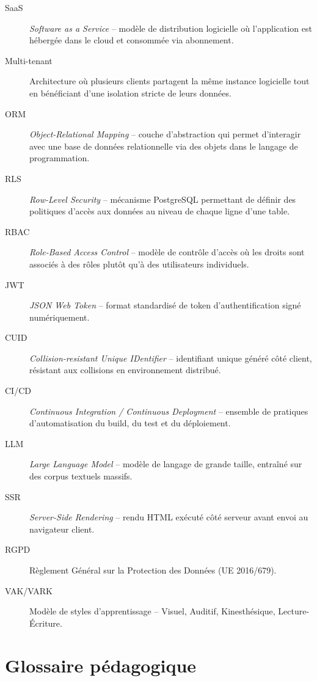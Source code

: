 \documentclass[12pt,a4paper,oneside]{report}
\begin{document}
\begin{description}
  \item[SaaS] \textit{Software as a Service} -- modèle de distribution logicielle où l'application est hébergée dans le cloud et consommée via abonnement.
  \item[Multi-tenant] Architecture où plusieurs clients partagent la même instance logicielle tout en bénéficiant d'une isolation stricte de leurs données.
  \item[ORM] \textit{Object-Relational Mapping} -- couche d'abstraction qui permet d'interagir avec une base de données relationnelle via des objets dans le langage de programmation.
  \item[RLS] \textit{Row-Level Security} -- mécanisme PostgreSQL permettant de définir des politiques d'accès aux données au niveau de chaque ligne d'une table.
  \item[RBAC] \textit{Role-Based Access Control} -- modèle de contrôle d'accès où les droits sont associés à des rôles plutôt qu'à des utilisateurs individuels.
  \item[JWT] \textit{JSON Web Token} -- format standardisé de token d'authentification signé numériquement.
  \item[CUID] \textit{Collision-resistant Unique IDentifier} -- identifiant unique généré côté client, résistant aux collisions en environnement distribué.
  \item[CI/CD] \textit{Continuous Integration / Continuous Deployment} -- ensemble de pratiques d'automatisation du build, du test et du déploiement.
  \item[LLM] \textit{Large Language Model} -- modèle de langage de grande taille, entraîné sur des corpus textuels massifs.
  \item[SSR] \textit{Server-Side Rendering} -- rendu HTML exécuté côté serveur avant envoi au navigateur client.
  \item[RGPD] Règlement Général sur la Protection des Données (UE 2016/679).
  \item[VAK/VARK] Modèle de styles d'apprentissage -- Visuel, Auditif, Kinesthésique, Lecture-Écriture.
\end{description}

\chapter{Glossaire pédagogique}
\end{document}

